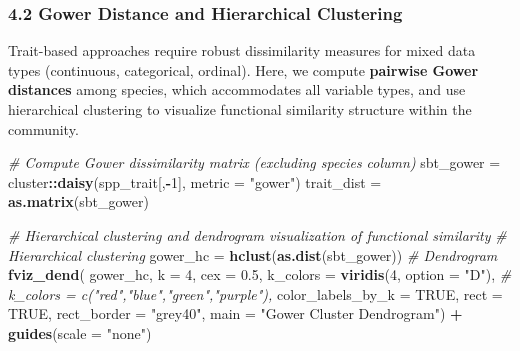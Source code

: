 \documentclass[
]{article}
\newenvironment{Shaded}{\begin{snugshade}}{\end{snugshade}}
\newcommand{\AttributeTok}[1]{\textcolor[rgb]{0.13,0.29,0.53}{#1}}
\newcommand{\CommentTok}[1]{\textcolor[rgb]{0.56,0.35,0.01}{\textit{#1}}}
\newcommand{\ConstantTok}[1]{\textcolor[rgb]{0.56,0.35,0.01}{#1}}
\newcommand{\DecValTok}[1]{\textcolor[rgb]{0.00,0.00,0.81}{#1}}
\newcommand{\FloatTok}[1]{\textcolor[rgb]{0.00,0.00,0.81}{#1}}
\newcommand{\FunctionTok}[1]{\textcolor[rgb]{0.13,0.29,0.53}{\textbf{#1}}}
\newcommand{\NormalTok}[1]{#1}
\newcommand{\OtherTok}[1]{\textcolor[rgb]{0.56,0.35,0.01}{#1}}
\newcommand{\SpecialCharTok}[1]{\textcolor[rgb]{0.81,0.36,0.00}{\textbf{#1}}}
\newcommand{\StringTok}[1]{\textcolor[rgb]{0.31,0.60,0.02}{#1}}
\begin{document}
\hypertarget{gower-distance-and-hierarchical-clustering}{%
\subsubsection{4.2 Gower Distance and Hierarchical
Clustering}\label{gower-distance-and-hierarchical-clustering}}

Trait-based approaches require robust dissimilarity measures for mixed
data types (continuous, categorical, ordinal). Here, we compute
\textbf{pairwise Gower distances} among species, which accommodates all
variable types, and use hierarchical clustering to visualize functional
similarity structure within the community.

\begin{Shaded}
\begin{Highlighting}[]
\CommentTok{\# Compute Gower dissimilarity matrix (excluding species column)}
\NormalTok{sbt\_gower }\OtherTok{=}\NormalTok{ cluster}\SpecialCharTok{::}\FunctionTok{daisy}\NormalTok{(spp\_trait[,}\SpecialCharTok{{-}}\DecValTok{1}\NormalTok{], }\AttributeTok{metric =} \StringTok{"gower"}\NormalTok{)}
\NormalTok{trait\_dist }\OtherTok{=} \FunctionTok{as.matrix}\NormalTok{(sbt\_gower)}

\CommentTok{\# Hierarchical clustering and dendrogram visualization of functional similarity}
\CommentTok{\# Hierarchical clustering}
\NormalTok{gower\_hc }\OtherTok{=} \FunctionTok{hclust}\NormalTok{(}\FunctionTok{as.dist}\NormalTok{(sbt\_gower))}
\CommentTok{\# Dendrogram}
\FunctionTok{fviz\_dend}\NormalTok{(}
\NormalTok{  gower\_hc,}
  \AttributeTok{k =} \DecValTok{4}\NormalTok{,}
  \AttributeTok{cex =} \FloatTok{0.5}\NormalTok{,}
  \AttributeTok{k\_colors =} \FunctionTok{viridis}\NormalTok{(}\DecValTok{4}\NormalTok{, }\AttributeTok{option =} \StringTok{"D"}\NormalTok{), }\CommentTok{\# k\_colors = c("red","blue","green","purple"),}
  \AttributeTok{color\_labels\_by\_k =} \ConstantTok{TRUE}\NormalTok{,}
  \AttributeTok{rect =} \ConstantTok{TRUE}\NormalTok{,}
  \AttributeTok{rect\_border =} \StringTok{"grey40"}\NormalTok{,}
  \AttributeTok{main =} \StringTok{"Gower Cluster Dendrogram"}\NormalTok{) }\SpecialCharTok{+} 
  \FunctionTok{guides}\NormalTok{(}\AttributeTok{scale =} \StringTok{"none"}\NormalTok{)}
\end{Highlighting}
\end{Shaded}
\end{document}
